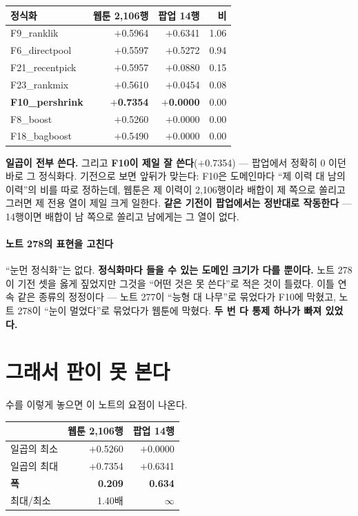 \documentclass[10pt]{article}
\begin{document}
\begin{center}\small
\begin{tabular}{lrrr}
\hline
정식화 & 웹툰 2,106행 & 팝업 14행 & 비 \\
\hline
F9\_ranklik & $+$0.5964 & $+$0.6341 & 1.06 \\
F6\_directpool & $+$0.5597 & $+$0.5272 & 0.94 \\
F21\_recentpick & $+$0.5957 & $+$0.0880 & 0.15 \\
F23\_rankmix & $+$0.5610 & $+$0.0454 & 0.08 \\
\textbf{F10\_pershrink} & \textbf{$+$0.7354} & \textbf{$+$0.0000} & 0.00 \\
F8\_boost & $+$0.5260 & $+$0.0000 & 0.00 \\
F18\_bagboost & $+$0.5490 & $+$0.0000 & 0.00 \\
\hline
\end{tabular}
\end{center}

\textbf{일곱이 전부 쓴다.} 그리고 \textbf{F10이 제일 잘 쓴다}($+$0.7354) ---
팝업에서 정확히 0 이던 바로 그 정식화다. 기전으로 보면 앞뒤가 맞는다:
F10은 도메인마다 ``제 이력 대 남의 이력''의 비를 따로 정하는데, 웹툰은 제
이력이 2,106행이라 배합이 제 쪽으로 쏠리고 그러면 제 전용 열이 제일 크게
일한다. \textbf{같은 기전이 팝업에서는 정반대로 작동한다} --- 14행이면 배합이
남 쪽으로 쏠리고 남에게는 그 열이 없다.

\paragraph{노트 278의 표현을 고친다} ``눈먼 정식화''는 없다. \textbf{정식화마다
들을 수 있는 도메인 크기가 다를 뿐이다.} 노트 278이 기전 셋을 옳게 짚었지만
그것을 ``어떤 것은 못 쓴다''로 적은 것이 틀렸다. 이틀 연속 같은 종류의
정정이다 --- 노트 277이 ``능형 대 나무''로 묶었다가 F10에 막혔고, 노트 278이
``눈이 멀었다''로 묶었다가 웹툰에 막혔다. \textbf{두 번 다 통제 하나가
빠져 있었다.}

\section{그래서 판이 못 본다}

수를 이렇게 놓으면 이 노트의 요점이 나온다.

\begin{center}\small
\begin{tabular}{lrr}
\hline
& 웹툰 2,106행 & 팝업 14행 \\
\hline
일곱의 최소 & $+$0.5260 & $+$0.0000 \\
일곱의 최대 & $+$0.7354 & $+$0.6341 \\
\textbf{폭} & \textbf{0.209} & \textbf{0.634} \\
최대/최소 & 1.40배 & $\infty$ \\
\hline
\end{tabular}
\end{center}
\end{document}
